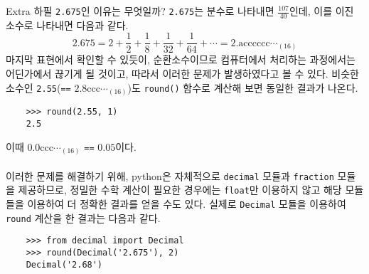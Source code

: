 \documentclass[a4paper,11pt]{scrartcl}
\begin{document}
\begin{labeling}{Extra}
  하필 \lstinline{2.675}인 이유는 무엇일까? \lstinline{2.675}는 분수로 나타내면 \(\frac{107}{40}\)인데, 이를 이진 소수로 나타내면 다음과 같다.
  \begin{displaymath}
    2.675 = 2 + \frac{1}{2} + \frac{1}{8} + \frac{1}{32} + \frac{1}{64} + \cdots =
    \mathrm{2.acccccc\cdots_{(16)}}
  \end{displaymath}
  마지막 표현에서 확인할 수 있듯이, 순환소수이므로 컴퓨터에서 처리하는 과정에서는 어딘가에서 끊기게 될 것이고, 따라서 이러한 문제가 발생하였다고 볼 수 있다. 비슷한 소수인 \lstinline{2.55}(\lstinline{==} \(\mathrm{2.8ccc}\cdots_{(16)}\))도 \lstinline{round()} 함수로 계산해 보면 동일한 결과가 나온다.
  \begin{lstlisting}
    >>> round(2.55, 1)
    2.5
  \end{lstlisting}
  이때 \(\mathrm{0.0ccc}\cdots_{(16)}\) \lstinline{==} \(0.05\)이다. \\
  \\
  이러한 문제를 해결하기 위해, python은 자체적으로 \lstinline{decimal} 모듈과 \lstinline{fraction} 모듈을 제공하므로, 정밀한 수학 계산이 필요한 경우에는 \lstinline{float}만 이용하지 않고 해당 모듈들을 이용하여 더 정확한 결과를 얻을 수도 있다. 실제로 \lstinline{Decimal} 모듈을 이용하여 \lstinline{round} 계산을 한 결과는 다음과 같다.
  \begin{lstlisting}
    >>> from decimal import Decimal
    >>> round(Decimal('2.675'), 2)
    Decimal('2.68')
  \end{lstlisting}
\end{labeling}
\end{document}
